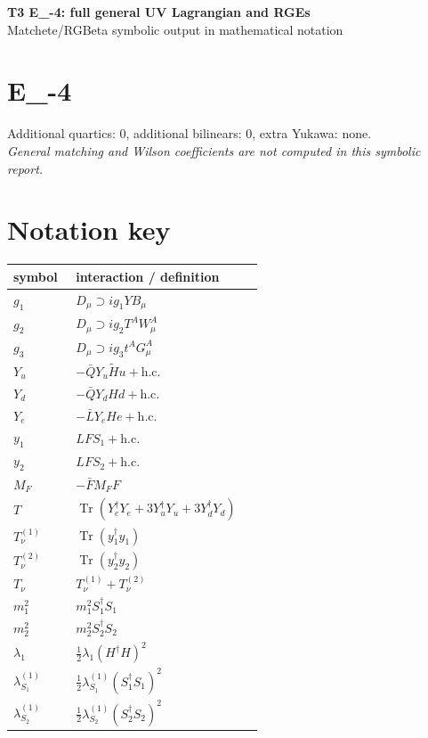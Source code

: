 \documentclass[10pt,a4paper]{article}
\begin{document}
\begin{center}
{\Large\bfseries T3 E\_-4: full general UV Lagrangian and RGEs}\\[4pt]
Matchete/RGBeta symbolic output in mathematical notation
\end{center}
\bigskip
\section*{E\_-4}
Additional quartics: 0, additional bilinears: 0, extra Yukawa: none.\\
\emph{General matching and Wilson coefficients are not computed in this symbolic report.}
\section*{Notation key}
\begin{longtable}{@{}p{0.23\linewidth}p{0.69\linewidth}@{}}
\toprule
symbol & interaction / definition \\
\midrule
$g_1$ & $D_\mu\supset i g_1YB_\mu$ \\
$g_2$ & $D_\mu\supset i g_2T^AW_\mu^A$ \\
$g_3$ & $D_\mu\supset i g_3t^AG_\mu^A$ \\
$Y_u$ & $-\bar QY_u\widetilde Hu+\mathrm{h.c.}$ \\
$Y_d$ & $-\bar QY_dHd+\mathrm{h.c.}$ \\
$Y_e$ & $-\bar LY_eHe+\mathrm{h.c.}$ \\
$y_1$ & $LFS_1+\mathrm{h.c.}$ \\
$y_2$ & $LFS_2+\mathrm{h.c.}$ \\
$M_F$ & $-\bar FM_FF$ \\
$T$ & $\operatorname{Tr}(Y_e^\dagger Y_e+3Y_u^\dagger Y_u+3Y_d^\dagger Y_d)$ \\
$T_\nu^{(1)}$ & $\operatorname{Tr}(y_1^\dagger y_1)$ \\
$T_\nu^{(2)}$ & $\operatorname{Tr}(y_2^\dagger y_2)$ \\
$T_\nu$ & $T_\nu^{(1)}+T_\nu^{(2)}$ \\
$m_1^2$ & $m_1^2S_1^\dagger S_1$ \\
$m_2^2$ & $m_2^2S_2^\dagger S_2$ \\
$\lambda_1$ & $\frac12\lambda_1(H^\dagger H)^2$ \\
$\lambda_{S_1}^{(1)}$ & $\frac12\lambda_{S_1}^{(1)}(S_1^\dagger S_1)^2$ \\
$\lambda_{S_2}^{(1)}$ & $\frac12\lambda_{S_2}^{(1)}(S_2^\dagger S_2)^2$ \\

\end{longtable}
\end{document}

